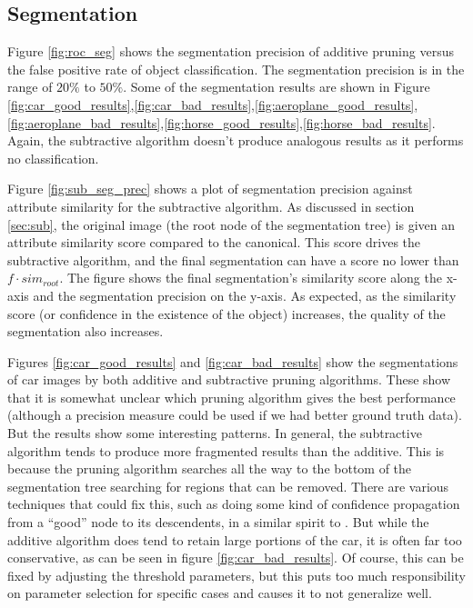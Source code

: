 \documentclass[10pt,twocolumn,letterpaper]{article}
\begin{document}
\subsection{Segmentation}
\label{ssec:segmentation}

Figure \ref{fig:roc_seg} shows the segmentation precision of additive pruning 
versus the false positive rate of object classification. The segmentation precision
is in the range of $20\%$ to $50\%$. Some of the segmentation results are shown in 
Figure \ref{fig:car_good_results},\ref{fig:car_bad_results},\ref{fig:aeroplane_good_results},\ref{fig:aeroplane_bad_results},\ref{fig:horse_good_results},\ref{fig:horse_bad_results}.  Again, the subtractive algorithm doesn't produce
analogous results as it performs no classification.

Figure \ref{fig:sub_seg_prec} shows a plot of segmentation precision against 
attribute similarity for the subtractive algorithm.  As discussed in section 
\ref{sec:sub}, the original image (the root node of the segmentation tree)
is given an attribute similarity score compared to the canonical.  This score
drives the subtractive algorithm, and the final segmentation can have a score
no lower than $f\cdot sim_{root}$.  The figure shows the final segmentation's
similarity score along the x-axis and the segmentation precision on the y-axis.
As expected, as the similarity score (or confidence in the existence of the
object) increases, the quality of the segmentation also increases.

Figures \ref{fig:car_good_results} and \ref{fig:car_bad_results} show the
segmentations of car images by both additive and subtractive pruning
algorithms. These show that it is somewhat unclear which pruning algorithm
gives the best performance (although a precision measure could be used if we
had better ground truth data).  But the results show some interesting patterns.
In general, the subtractive algorithm tends to produce more fragmented results
than the additive.  This is because the pruning algorithm searches all the way
to the bottom of the segmentation tree searching for regions that can be removed.
There are various techniques that could fix this, such as doing some kind of
confidence propagation from a ``good'' node to its descendents, in a similar
spirit to \cite{borenstein04}.  But while the additive algorithm does tend
to retain large portions of the car, it is often far too conservative, as
can be seen in figure \ref{fig:car_bad_results}.  Of course, this can be 
fixed by adjusting the threshold parameters, but this puts too much responsibility
on parameter selection for specific cases and causes it to not generalize well.
\end{document}
